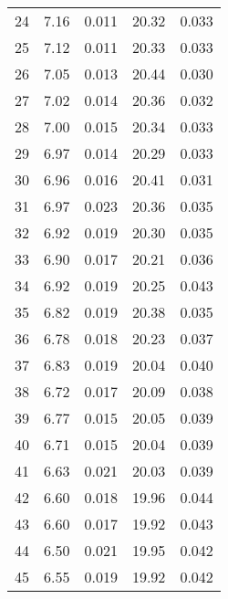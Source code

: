 \begin{table}
\begin{tabular}{c|ll|ll}
24 & 7.16 & 0.011 & 20.32 & 0.033 \\
25 & 7.12 & 0.011 & 20.33 & 0.033 \\
26 & 7.05 & 0.013 & 20.44 & 0.030 \\
27 & 7.02 & 0.014 & 20.36 & 0.032 \\
28 & 7.00 & 0.015 & 20.34 & 0.033 \\
29 & 6.97 & 0.014 & 20.29 & 0.033 \\
30 & 6.96 & 0.016 & 20.41 & 0.031 \\
31 & 6.97 & 0.023 & 20.36 & 0.035 \\
32 & 6.92 & 0.019 & 20.30 & 0.035 \\
33 & 6.90 & 0.017 & 20.21 & 0.036 \\
34 & 6.92 & 0.019 & 20.25 & 0.043 \\
35 & 6.82 & 0.019 & 20.38 & 0.035 \\
36 & 6.78 & 0.018 & 20.23 & 0.037 \\
37 & 6.83 & 0.019 & 20.04 & 0.040 \\
38 & 6.72 & 0.017 & 20.09 & 0.038 \\
39 & 6.77 & 0.015 & 20.05 & 0.039 \\
40 & 6.71 & 0.015 & 20.04 & 0.039 \\
41 & 6.63 & 0.021 & 20.03 & 0.039 \\
42 & 6.60 & 0.018 & 19.96 & 0.044 \\
43 & 6.60 & 0.017 & 19.92 & 0.043 \\
44 & 6.50 & 0.021 & 19.95 & 0.042 \\
45 & 6.55 & 0.019 & 19.92 & 0.042 \\
               \hline
        \end{tabular}
    \end{table}
    \clearpage

